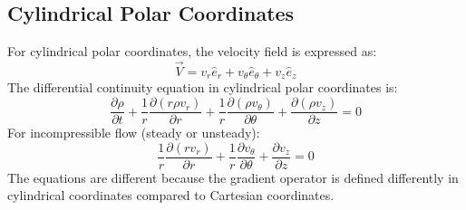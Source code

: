 ﻿\documentclass[12pt]{article}
\begin{document}
\subsection*{Cylindrical Polar Coordinates}
For cylindrical polar coordinates, the velocity field is expressed as:
\[
\vec V=v_r\hat e_r+v_\theta\hat e_\theta+v_z\hat e_z
\]
The differential continuity equation in cylindrical polar coordinates is:
\[
\boxed{\frac{\partial\rho}{\partial t}+\frac1r\frac{\partial(r\rho v_r)}{\partial r}+\frac1r\frac{\partial(\rho v_\theta)}{\partial\theta}+\frac{\partial(\rho v_z)}{\partial z}=0}
\]
For incompressible flow (steady or unsteady):
\[
\boxed{\frac1r\frac{\partial(rv_r)}{\partial r}+\frac1r\frac{\partial v_\theta}{\partial\theta}+\frac{\partial v_z}{\partial z}=0}
\]
The equations are different because the gradient operator is defined differently in cylindrical coordinates compared to Cartesian coordinates.
\end{document}
